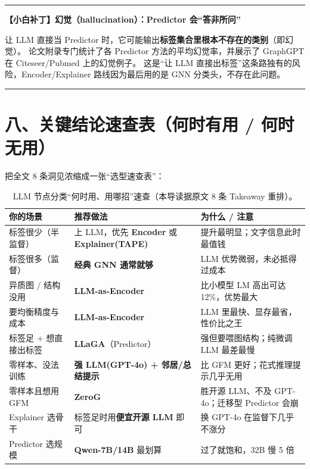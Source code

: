 \documentclass[11pt,UTF8,fontset=fandol]{ctexart}
\newenvironment{tip}[1]{%
  \par\smallskip\noindent\rule{\linewidth}{0.4pt}\par\nobreak
  \noindent\textbf{【小白补丁】#1}\par\nobreak\noindent\ignorespaces
}{%
  \par\noindent\rule{\linewidth}{0.4pt}\par\smallskip
}
\begin{document}
\begin{tip}{幻觉（hallucination）：Predictor 会“答非所问”}
让 LLM 直接当 Predictor 时，它可能输出\textbf{标签集合里根本不存在的类别}（即幻觉）。
论文附录专门统计了各 Predictor 方法的平均幻觉率，并展示了 GraphGPT 在 Citeseer/Pubmed 上的幻觉例子。
这是“让 LLM 直接出标签”这条路独有的风险，Encoder/Explainer 路线因为最后用的是 GNN 分类头，不存在此问题。
\end{tip}

\section{八、关键结论速查表（何时有用 / 何时无用）}

把全文 8 条洞见浓缩成一张“选型速查表”：

\begin{table}[H]\centering
\caption{LLM 节点分类“何时用、用哪招”速查（本导读据原文 8 条 Takeaway 重排）。}
\renewcommand{\arraystretch}{1.25}
\begin{tabular}{p{4.2cm}p{4.0cm}p{4.2cm}}
\toprule
\textbf{你的场景} & \textbf{推荐做法} & \textbf{为什么 / 注意} \\
\midrule
标签很少（半监督） & 上 LLM，优先 \textbf{Encoder} 或 \textbf{Explainer(TAPE)} & 提升最明显；文字信息此时最值钱 \\
标签很多（监督） & \textbf{经典 GNN 通常就够} & LLM 优势微弱，未必抵得过成本 \\
异质图 / 结构没用 & \textbf{LLM-as-Encoder} & 比小模型 LM 高出可达 12\%，优势最大 \\
要均衡精度与成本 & \textbf{LLM-as-Encoder} & LLM 里最快、显存最省，性价比之王 \\
标签足 + 想直接出标签 & \textbf{LLaGA}（Predictor） & 强但要喂图结构；纯微调 LLM 最差最慢 \\
零样本、没法训练 & \textbf{强 LLM(GPT-4o) + 邻居/总结提示} & 比 GFM 更好；花式推理提示几乎无用 \\
零样本且想用 GFM & \textbf{ZeroG} & 胜开源 LLM、不及 GPT-4o；迁移型 Predictor 会崩 \\
Explainer 选骨干 & 标签足时用\textbf{便宜开源 LLM} 即可 & 换 GPT-4o 在监督下几乎不涨分 \\
Predictor 选规模 & \textbf{Qwen-7B/14B} 最划算 & 过了就饱和，32B 慢 5 倍 \\
\bottomrule
\end{tabular}
\end{table}
\end{document}
